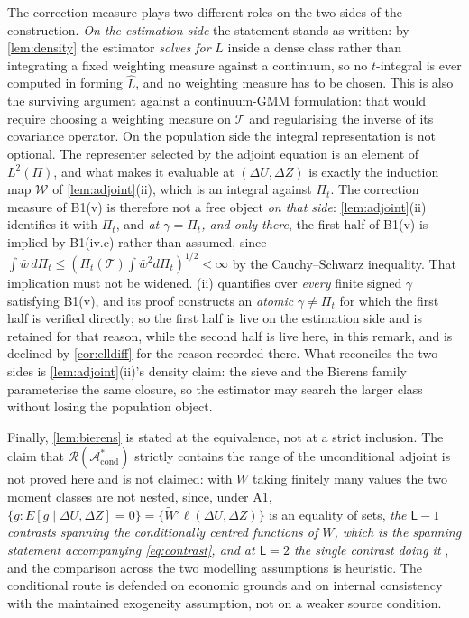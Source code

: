 \begin{remark}
The correction measure plays two different roles on the two sides of the construction.
\emph{On the estimation side} the
statement stands as written: by \cref{lem:density} the estimator \emph{solves for} $L$ inside a dense
class rather than integrating a fixed weighting measure against a continuum, so no $t$-integral is ever
computed in forming $\hat L$, and no weighting measure has to be chosen. This is also the surviving
argument against a continuum-GMM formulation: that would require choosing a weighting measure on
$\mathcal T$ and regularising the inverse of its covariance operator. On the population side the
integral representation is not optional. The representer selected by the adjoint equation is an element
of $L^{2}(\Pi)$, and what makes it evaluable at $(\Delta U,\Delta Z)$ is exactly the induction map
$\mathcal W$ of \cref{lem:adjoint}(ii), which is an integral against $\Pi_t$. The correction measure of
B1(v) is therefore not a free object \emph{on that side}: \cref{lem:adjoint}(ii) identifies it with
$\Pi_t$, and \emph{at $\gamma=\Pi_t$, and only there}, the first half of B1(v) is implied by B1(iv.c)
rather than assumed, since
$\int\bar w\,d\Pi_t\le(\Pi_t(\mathcal T)\int\bar w^{2}d\Pi_t)^{1/2}<\infty$ by the Cauchy--Schwarz
inequality. That implication must not be widened.
(ii) quantifies over \emph{every} finite signed $\gamma$
satisfying B1(v), and its proof constructs an \emph{atomic} $\gamma\ne\Pi_t$ for which the first half is
verified directly; so the first half is live on the estimation side and is retained for that reason,
while the second half is live here, in this remark, and is declined by \cref{cor:elldiff} for the reason
recorded there. What reconciles the two sides is \cref{lem:adjoint}(ii)'s density claim: the sieve and
the Bierens family parameterise the same closure, so the estimator may search the larger class without
losing the population object.

Finally, \cref{lem:bierens} is stated at the equivalence, not at a strict inclusion. The claim that
$\mathcal R(\mathcal A^\ast_{\mathrm{cond}})$ strictly contains the range of the unconditional adjoint is
not proved here and is not claimed: with $W$ taking finitely many values the two moment classes are not
nested, since, under A1,
$\{g:E[g\mid\Delta U,\Delta Z]=0\}=\{\widetilde W'\ell(\Delta U,\Delta Z)\}$ is an equality of sets, 
\emph{the $\mathsf L-1$ contrasts spanning the conditionally centred functions of $W$, which is the
spanning statement accompanying \eqref{eq:contrast}, and at $\mathsf L=2$ the single contrast doing it}
, and
the comparison across the two modelling assumptions is heuristic. The conditional route is defended on
economic grounds and on internal consistency with the maintained exogeneity assumption, not on a weaker
source condition.
\end{remark}

